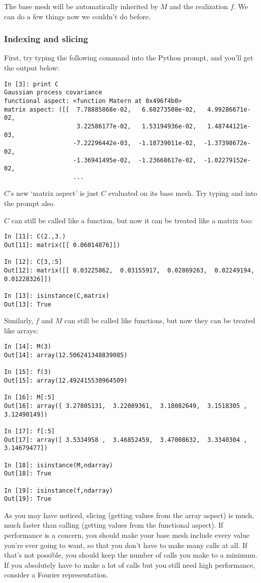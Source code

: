 \documentclass{manual}
\begin{document}
The base mesh will be automatically inherited by $M$ and the realization $f$. We can do a few things now we couldn't do before.

\subsubsection{Indexing and slicing}\label{subsub:indexslice}
First, try typing the following command into the Python prompt, and you'll get the output below:
\begin{verbatim}
In [3]: print C
Gaussian process covariance
functional aspect: <function Matern at 0x496f4b0>
matrix aspect: ([[  7.78885868e-02,   6.60273508e-02,   4.99286671e-02,
                    3.22586177e-02,   1.53194936e-02,   1.48744121e-03,
                   -7.22296442e-03,  -1.18739011e-02,  -1.37398672e-02,
                   -1.36941495e-02,  -1.23668617e-02,  -1.02279152e-02,
                   ...
\end{verbatim}
$C$'s new `matrix aspect' is just $C$ evaluated on its base mesh. Try typing  and  into the prompt also. 

$C$ can still be called like a function, but now it can be treated like a matrix too:
\begin{verbatim}
In [11]: C(2.,3.)
Out[11]: matrix([[ 0.06014876]])

In [12]: C[3,:5]
Out[12]: matrix([[ 0.03225862,  0.03155917,  0.02869263,  0.02249194,  0.01228326]])

In [13]: isinstance(C,matrix)
Out[13]: True
\end{verbatim}
Similarly, $f$ and $M$ can still be called like functions, but now they can be treated like arrays:
\begin{verbatim}
In [14]: M(3)
Out[14]: array(12.506241348839085)

In [15]: f(3)
Out[15]: array(12.492415530964509)

In [16]: M[:5]
Out[16]: array([ 3.27805131,  3.22089361,  3.18082649,  3.1518305 ,  3.12490149])

In [17]: f[:5]
Out[17]: array([ 3.5334958 ,  3.46852459,  3.47008632,  3.3340304 ,  3.14679477])

In [18]: isinstance(M,ndarray)
Out[18]: True

In [19]: isinstance(f,ndarray)
Out[19]: True
\end{verbatim}

As you may have noticed, slicing (getting values from the array aspect) is much, much faster than calling (getting values from the functional aspect). If performance is a concern, you should make your base mesh include every value you're ever going to want, so that you don't have to make many calls at all. If that's not possible, you should keep the number of calls you make to a minimum. If you absolutely have to make a lot of calls but you still need high performance, consider a Fourier representation.
 
\end{document}

